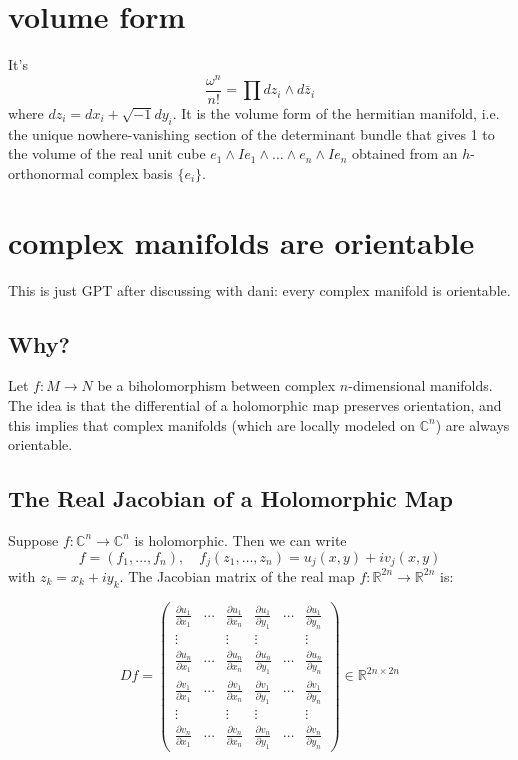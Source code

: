 \section{volume form}
It's
\[\frac{\omega^n}{n!}=\prod dz_i \wedge d\bar{z}_i\]
where \(dz_i=dx_i + \sqrt{-1}dy_i\). It is the volume form of the hermitian manifold, i.e. the unique nowhere-vanishing section of the determinant bundle that gives 1 to the volume of the real unit cube \(e_1 \wedge Ie_1\wedge\ldots\wedge e_n \wedge I e_n\) obtained from an \(h\)-orthonormal complex basis \(\{e_i\}\).

\section{complex manifolds are orientable}

This is just GPT after discussing with dani: every complex manifold is orientable.

\subsection*{Why?}

Let \( f: M \to N \) be a biholomorphism between complex \(n\)-dimensional manifolds. The idea is that the differential of a holomorphic map preserves orientation, and this implies that complex manifolds (which are locally modeled on \(\mathbb{C}^n\)) are always orientable.

\subsection*{The Real Jacobian of a Holomorphic Map}

Suppose \( f: \mathbb{C}^n \to \mathbb{C}^n \) is holomorphic. Then we can write
\[
f = (f_1, \dots, f_n), \quad f_j(z_1, \dots, z_n) = u_j(x, y) + i v_j(x, y)
\]
with \( z_k = x_k + i y_k \). The Jacobian matrix of the real map \( f: \mathbb{R}^{2n} \to \mathbb{R}^{2n} \) is:

\[
Df =
\begin{pmatrix}
\frac{\partial u_1}{\partial x_1} & \cdots & \frac{\partial u_1}{\partial x_n} & \frac{\partial u_1}{\partial y_1} & \cdots & \frac{\partial u_1}{\partial y_n} \\
\vdots & & \vdots & \vdots & & \vdots \\
\frac{\partial u_n}{\partial x_1} & \cdots & \frac{\partial u_n}{\partial x_n} & \frac{\partial u_n}{\partial y_1} & \cdots & \frac{\partial u_n}{\partial y_n} \\
\frac{\partial v_1}{\partial x_1} & \cdots & \frac{\partial v_1}{\partial x_n} & \frac{\partial v_1}{\partial y_1} & \cdots & \frac{\partial v_1}{\partial y_n} \\
\vdots & & \vdots & \vdots & & \vdots \\
\frac{\partial v_n}{\partial x_1} & \cdots & \frac{\partial v_n}{\partial x_n} & \frac{\partial v_n}{\partial y_1} & \cdots & \frac{\partial v_n}{\partial y_n}
\end{pmatrix}
\in \mathbb{R}^{2n \times 2n}
\]

